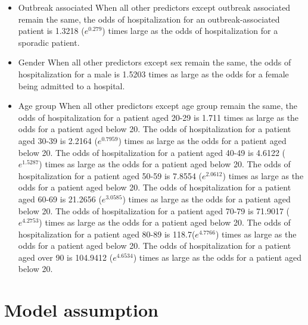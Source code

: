\documentclass[
]{article}
\providecommand{\tightlist}{%
  \setlength{\itemsep}{0pt}\setlength{\parskip}{0pt}}
\begin{document}
\begin{itemize}
\tightlist
\item
  Outbreak associated
  When all other predictors except outbreak associated remain the same, the odds of hospitalization for an outbreak-associated patient is 1.3218 (\(e^{0.279}\)) times large as the odds of hospitalization for a sporadic patient.
\item
  Gender
  When all other predictors except sex remain the same, the odds of hospitalization for a male is 1.5203 times as large as the odds for a female being admitted to a hospital.
\item
  Age group
  When all other predictors except age group remain the same, the odds of hospitalization for a patient aged 20-29 is 1.711 times as large as the odds for a patient aged below 20. The odds of hospitalization for a patient aged 30-39 is 2.2164 (\(e^{0.7959}\)) times as large as the odds for a patient aged below 20. The odds of hospitalization for a patient aged 40-49 is 4.6122 (\(e^{1.5287}\)) times as large as the odds for a patient aged below 20. The odds of hospitalization for a patient aged 50-59 is 7.8554 (\(e^{2.0612}\)) times as large as the odds for a patient aged below 20. The odds of hospitalization for a patient aged 60-69 is 21.2656 (\(e^{3.0585}\)) times as large as the odds for a patient aged below 20. The odds of hospitalization for a patient aged 70-79 is 71.9017 (\(e^{4.2753}\)) times as large as the odds for a patient aged below 20. The odds of hospitalization for a patient aged 80-89 is 118.7(\(e^{4.7766}\)) times as large as the odds for a patient aged below 20. The odds of hospitalization for a patient aged over 90 is 104.9412 (\(e^{4.6534}\)) times as large as the odds for a patient aged below 20.
\end{itemize}

\hypertarget{model-assumption}{%
\section{Model assumption}\label{model-assumption}}
\end{document}
